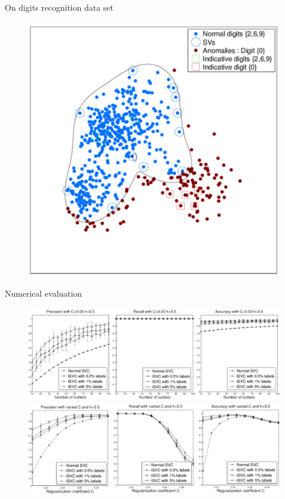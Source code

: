 \begin{frame}{On digits recognition data set}
\begin{figure}
\includegraphics[scale=0.167]{imgs/real_01_03.pdf}
\end{figure}
\end{frame}
\begin{frame}{Numerical evaluation}
\begin{figure}
\centering
\includegraphics[scale=0.25]{imgs/real_02.pdf}\\
\includegraphics[scale=0.25]{imgs/real_03.pdf}
\end{figure}
\end{frame}
